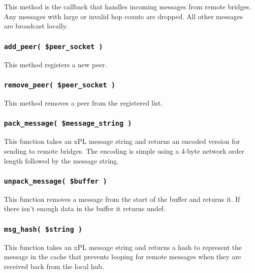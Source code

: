 This method is the callback that handles incoming messages from remote
bridges.  Any messages with large or invalid hop counts are dropped.
All other messages are broadcast locally.

\subsubsection*{\texttt{add\_peer( \$peer\_socket )}\label{xPL::Bridge_add_peer_peer_socket_}}


This method registers a new peer.

\subsubsection*{\texttt{remove\_peer( \$peer\_socket )}\label{xPL::Bridge_remove_peer_peer_socket_}}


This method removes a peer from the registered list.

\subsubsection*{\texttt{pack\_message( \$message\_string )}\label{xPL::Bridge_pack_message_message_string_}}


This function takes an xPL message string and returns an encoded
version for sending to remote bridges.  The encoding is simple using a
4-byte network order length followed by the message string.

\subsubsection*{\texttt{unpack\_message( \$buffer )}\label{xPL::Bridge_unpack_message_buffer_}}


This function removes a message from the start of the buffer and
returns it.  If there isn't enough data in the buffer it returns
undef.

\subsubsection*{\texttt{msg\_hash( \$string )}\label{xPL::Bridge_msg_hash_string_}}


This function takes an xPL message string and returns a hash to
represent the message in the cache that prevents looping for remote
messages when they are received back from the local hub.

